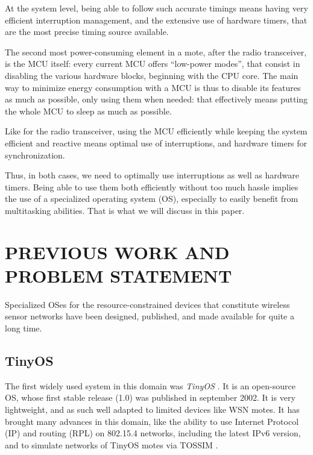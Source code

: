 \documentclass[a4paper,twoside]{article}
\begin{document}
At the system level, being able to follow such accurate timings means having
very efficient interruption management, and the extensive use of hardware
timers, that are the most precise timing source available.

The second most power-consuming element in a mote, after the radio
transceiver, is the MCU itself: every current MCU offers ``low-power modes'',
that consist in disabling the various hardware blocks, beginning with the CPU
core. The main way to minimize energy consumption with a MCU is thus
to disable its features as much as possible, only using them when needed:
that effectively means putting the whole MCU to sleep as much as possible.

Like for the radio transceiver, using the MCU efficiently while keeping
the system efficient and reactive means optimal use of interruptions,
and hardware timers for synchronization.

Thus, in both cases, we need to optimally use interruptions as well as
hardware timers. Being able to use them both efficiently without too much
hassle implies the use of a specialized operating system (OS), especially
to easily benefit from multitasking abilities. That is what we will
discuss in this paper.


\section{\uppercase{Previous work and problem statement}}

Specialized OSes for the resource-constrained devices that constitute
wireless sensor networks have been designed, published, and made available
for quite a long time.

\subsection{TinyOS}

The first widely used system in this domain was \emph{TinyOS} \cite{TinyOS}.
It is an open-source OS, whose first stable release (1.0) was published in
september 2002. It is very lightweight, and as such well adapted to limited
devices like WSN motes.  It has brought many advances in this domain, like
the ability to use Internet Protocol (IP) and routing (RPL) on 802.15.4
networks, including the latest IPv6 version, and to simulate networks
of TinyOS motes via TOSSIM \cite{TOSSIM}.
\end{document}
